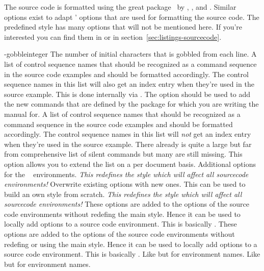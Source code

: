 \documentclass[load-preamble+,babel-options={ngerman,english}]{cnltx-doc}
\newcommand*\file[1]{\code{#1}}
\begin{document}
The source code is formatted using the great 
package~\cite{pkg:listings} by \heinz, \moses, and \hoffmann.  Similar options
exist to adapt ' options that are used for formatting the source
code.  The predefined style has many options that will not be mentioned here.
If you're interested you can find them in \file{cnltx-example.sty} or in
section~\vref{sec:listings-sourcecode}.
\begin{options}
  \keyval-{gobble}{integer}
    The number of initial characters that is gobbled from each line.
  \Default
    A list of control sequence names that should be recognized as a command
    sequence in the source code examples and should be formatted accordingly.
    The control sequence names in this list will also get an index entry when
    they're used in the source example.  This is done internally via
    .  The option should be used to add the new commands that are
    defined by the package for which you are writing the manual for.
    A list of control sequence names that should be recognized as a command
    sequence in the source code examples and should be formatted accordingly.
    The control sequence names in this list will \emph{not} get an index entry
    when they're used in the source example.  There already is quite a large
    but far from comprehensive list of silent commands but many are still
    missing.  This option allows you to extend the list on a per document
    basis.
  \Default
    Additional options for the ~\cite{pkg:listings}
    environments.  \emph{This redefines the   style
      which will affect all sourcecode environments!}
    Overwrite existing options with new ones.  This can be used to build an own
    style from scratch.  \emph{This redefines the  
      style which will affect all sourcecode environments!}
    These options are added to the  options of
    the source code environments without redefing the main style.  Hence it
    can be used to locally add options to a source code environment.  This is
    basically .
    These options are added to the  options
    of the source code environments without redefing or using the main style.
    Hence it can be used to locally add options to a source code environment.
    This is basically .
  \Default
    Like  but for environment names.
    Like  but for environment names.
\end{options}
\end{document}
